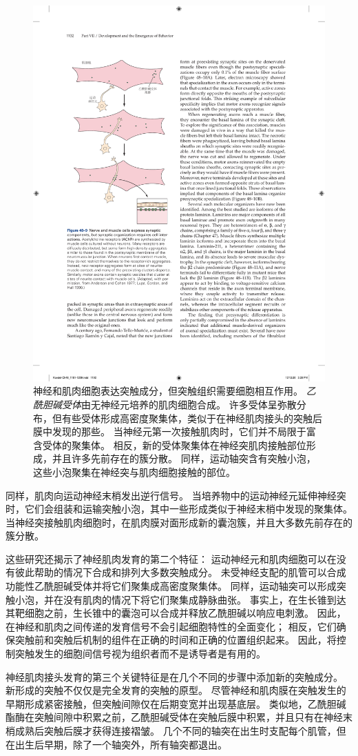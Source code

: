 \begin{figure}[htbp]
	\centering
	\includegraphics[width=0.57\linewidth]{chap48/fig_48_9}
	\caption{神经和肌肉细胞表达突触成分，但突触组织需要细胞相互作用。
		\textit{乙酰胆碱受体}由无神经元培养的肌肉细胞合成。
		许多受体呈弥散分布，但有些受体形成高密度聚集体，类似于在神经肌肉接头的突触后膜中发现的那些。
		当神经元第一次接触肌肉时，它们并不局限于富含受体的聚集体。
		相反，新的受体聚集体在神经突肌肉接触部位形成，并且许多先前存在的簇分散。
		同样，运动轴突含有突触小泡，这些小泡聚集在神经突与肌肉细胞接触的部位\cite{anderson1977nerve,lupa1990specific}。}
	\label{fig:48_9}
\end{figure}


同样，肌肉向运动神经末梢发出逆行信号。
当培养物中的运动神经元延伸神经突时，它们会组装和运输突触小泡，其中一些形成类似于神经末梢中发现的聚集体。
当神经突接触肌肉细胞时，在肌肉膜对面形成新的囊泡簇，并且大多数先前存在的簇分散。


这些研究还揭示了神经肌肉发育的第二个特征：
运动神经元和肌肉细胞可以在没有彼此帮助的情况下合成和排列大多数突触成分。
未受神经支配的肌管可以合成功能性乙酰胆碱受体并将它们聚集成高密度聚集体。
同样，运动轴突可以形成突触小泡，并在没有肌肉的情况下将它们聚集成静脉曲张。
事实上，在生长锥到达其靶细胞之前，生长锥中的囊泡可以合成并释放乙酰胆碱以响应电刺激。
因此，在神经和肌肉之间传递的发育信号不会引起细胞特性的全面变化；
相反，它们确保突触前和突触后机制的组件在正确的时间和正确的位置组织起来。
因此，将控制突触发生的细胞间信号视为组织者而不是诱导者是有用的。


神经肌肉接头发育的第三个关键特征是在几个不同的步骤中添加新的突触成分。
新形成的突触不仅仅是完全发育的突触的原型。
尽管神经和肌肉膜在突触发生的早期形成紧密接触，但突触间隙仅在后期变宽并出现基底层。
类似地，乙酰胆碱酯酶在突触间隙中积累之前，乙酰胆碱受体在突触后膜中积累，并且只有在神经末梢成熟后突触后膜才获得连接褶皱。
几个不同的轴突在出生时支配每个肌管，但在出生后早期，除了一个轴突外，所有轴突都退出。



